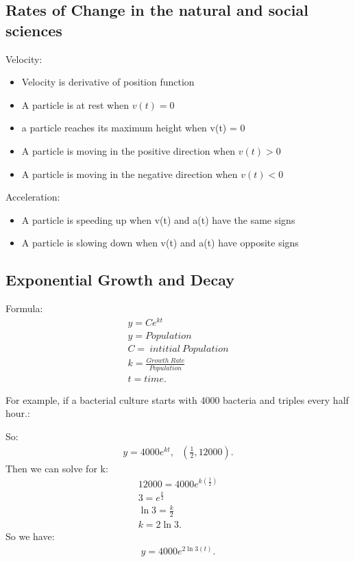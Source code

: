 \documentclass{report}
\begin{document}
    \pagebreak \bigbreak \noindent
    \subsection{Rates of Change in the natural and social sciences}
    \bigbreak \noindent 
    Velocity:
    \begin{itemize}
      \item Velocity is derivative of position function
      \item A particle is at rest when $v(t) = 0 $
      \item a particle reaches its maximum height when v(t) = 0
      \item A particle is moving in the positive direction when $v(t) > 0 $
      \item A particle is moving in the negative direction when $v(t) < 0 $
    \end{itemize}
    \bigbreak \noindent \bigbreak \noindent 
    Acceleration:
    \begin{itemize}
      \item A particle is speeding up when v(t) and a(t) have the same signs
      \item A particle is slowing down when v(t) and a(t) have opposite signs
    \end{itemize}

    \bigbreak \noindent \bigbreak \noindent 
    \subsection{Exponential Growth and Decay}
    \bigbreak \noindent \bigbreak \noindent
    Formula:
    \begin{align*}
      y = Ce^{kt} \\
      y = Population \\
      C =\ intitial\ Population \\
      k = \frac{Growth\ Rate}{Population} \\
      t = time
    .\end{align*}

    \bigbreak \noindent \bigbreak \noindent
    For example, if a bacterial culture starts with 4000 bacteria and triples every half hour.:

    \bigbreak \noindent \bigbreak \noindent
    So:
    \begin{align*}
      y = 4000e^{kt},\ \ \ (\frac{1}{2}, 12000)
    .\end{align*}
    \bigbreak \noindent \bigbreak \noindent
    Then we can solve for k:
    \begin{align*}
      12000 = 4000e^{k(\frac{1}{2})} \\
      3 = e^{\frac{k}{2}} \\
      \ln{3} = \frac{k}{2} \\
      k = 2\ln{3}
    .\end{align*}
    \bigbreak \noindent 
    So we have:
    \begin{align*}
      y = 4000e^{2\ln{3}(t)}
    .\end{align*}
\end{document}

